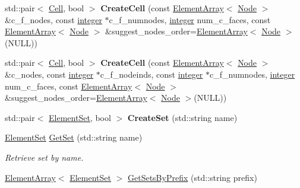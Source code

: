 \begin{DoxyCompactItemize}
\item 
\hypertarget{classINMOST_1_1Mesh_a8f493557835c8b2f571cf2af98b1c38f}{std\-::pair$<$ \hyperlink{classINMOST_1_1Cell}{Cell}, bool $>$ {\bfseries Create\-Cell} (const \hyperlink{classINMOST_1_1ElementArray}{Element\-Array}$<$ \hyperlink{classINMOST_1_1Node}{Node} $>$ \&c\-\_\-f\-\_\-nodes, const \hyperlink{classINMOST_1_1Storage_aec96942bc647417a801e2895b45964d2}{integer} $\ast$c\-\_\-f\-\_\-numnodes, \hyperlink{classINMOST_1_1Storage_aec96942bc647417a801e2895b45964d2}{integer} num\-\_\-c\-\_\-faces, const \hyperlink{classINMOST_1_1ElementArray}{Element\-Array}$<$ \hyperlink{classINMOST_1_1Node}{Node} $>$ \&suggest\-\_\-nodes\-\_\-order=\hyperlink{classINMOST_1_1ElementArray}{Element\-Array}$<$ \hyperlink{classINMOST_1_1Node}{Node} $>$(N\-U\-L\-L))}\label{classINMOST_1_1Mesh_a8f493557835c8b2f571cf2af98b1c38f}

\item 
\hypertarget{classINMOST_1_1Mesh_a5a0ca2ce40dfebddd57f006643477234}{std\-::pair$<$ \hyperlink{classINMOST_1_1Cell}{Cell}, bool $>$ {\bfseries Create\-Cell} (const \hyperlink{classINMOST_1_1ElementArray}{Element\-Array}$<$ \hyperlink{classINMOST_1_1Node}{Node} $>$ \&c\-\_\-nodes, const \hyperlink{classINMOST_1_1Storage_aec96942bc647417a801e2895b45964d2}{integer} $\ast$c\-\_\-f\-\_\-nodeinds, const \hyperlink{classINMOST_1_1Storage_aec96942bc647417a801e2895b45964d2}{integer} $\ast$c\-\_\-f\-\_\-numnodes, \hyperlink{classINMOST_1_1Storage_aec96942bc647417a801e2895b45964d2}{integer} num\-\_\-c\-\_\-faces, const \hyperlink{classINMOST_1_1ElementArray}{Element\-Array}$<$ \hyperlink{classINMOST_1_1Node}{Node} $>$ \&suggest\-\_\-nodes\-\_\-order=\hyperlink{classINMOST_1_1ElementArray}{Element\-Array}$<$ \hyperlink{classINMOST_1_1Node}{Node} $>$(N\-U\-L\-L))}\label{classINMOST_1_1Mesh_a5a0ca2ce40dfebddd57f006643477234}

\item 
\hypertarget{classINMOST_1_1Mesh_a13c27ec28c027eaf82475a35ab97b0ad}{std\-::pair$<$ \hyperlink{classINMOST_1_1ElementSet}{Element\-Set}, bool $>$ {\bfseries Create\-Set} (std\-::string name)}\label{classINMOST_1_1Mesh_a13c27ec28c027eaf82475a35ab97b0ad}

\item 
\hyperlink{classINMOST_1_1ElementSet}{Element\-Set} \hyperlink{classINMOST_1_1Mesh_a5223aa8af17d63c7be40027ff789df7e}{Get\-Set} (std\-::string name)
\begin{DoxyCompactList}\small\item\em Retrieve set by name. \end{DoxyCompactList}\item 
\hypertarget{classINMOST_1_1Mesh_a031ce76512ea59b68cad89aca64b8da7}{\hyperlink{classINMOST_1_1ElementArray}{Element\-Array}$<$ \hyperlink{classINMOST_1_1ElementSet}{Element\-Set} $>$ \hyperlink{classINMOST_1_1Mesh_a031ce76512ea59b68cad89aca64b8da7}{Get\-Sets\-By\-Prefix} (std\-::string prefix)}\label{classINMOST_1_1Mesh_a031ce76512ea59b68cad89aca64b8da7}


\end{DoxyCompactItemize}
